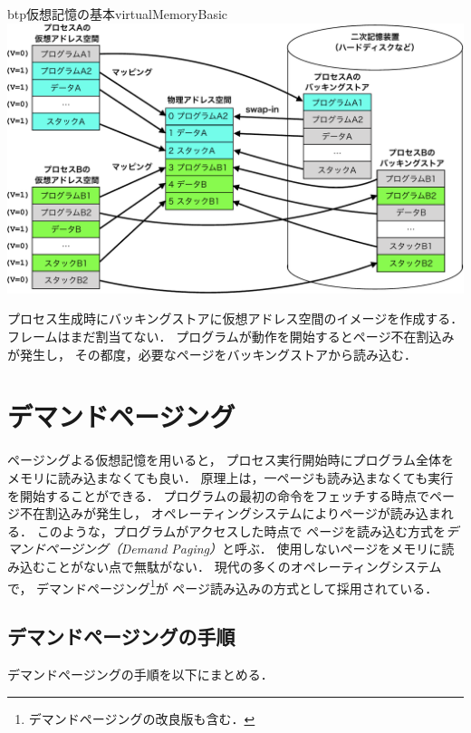 \begin{myfig}{btp}{仮想記憶の基本}{virtualMemoryBasic}
  \includegraphics[scale=0.66]{Fig/virtualMemoryBasic-crop.pdf}
\end{myfig}

プロセス生成時にバッキングストアに仮想アドレス空間のイメージを作成する．
フレームはまだ割当てない．
プログラムが動作を開始するとページ不在割込みが発生し，
その都度，必要なページをバッキングストアから読み込む．

\section{デマンドページング}\label{demandPaging}
ページングよる仮想記憶を用いると，
プロセス実行開始時にプログラム全体をメモリに読み込まなくても良い．
原理上は，一ページも読み込まなくても実行を開始することができる．
プログラムの最初の命令をフェッチする時点でページ不在割込みが発生し，
オペレーティングシステムによりページが読み込まれる．
このような，プログラムがアクセスした時点で
ページを読み込む方式を\emph{デマンドページング（Demand Paging）}と呼ぶ．
使用しないページをメモリに読み込むことがない点で無駄がない．
現代の多くのオペレーティングシステムで，
デマンドページング\footnote{デマンドページングの改良版も含む．}が
ページ読み込みの方式として採用されている．

\subsection{デマンドページングの手順}
デマンドページングの手順を以下にまとめる．

